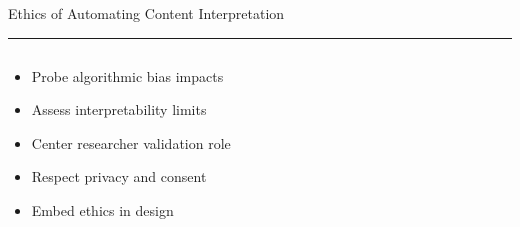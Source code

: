 \documentclass[aspectratio=169]{beamer}
\newcommand{\TitleFont}{\rmfamily}
\begin{document}
\begin{frame}[t]{}
  \vspace*{0.5cm}
  {\TitleFont\fontsize{18}{22}\selectfont\color{LUBronze}Ethics of Automating Content Interpretation\par}
  \vspace{0.3em}
  {\color{LUBronze}\rule{\linewidth}{0.8pt}}\par
  \vspace{0.2cm}
  \begin{columns}[t]
    \begin{column}[t]{0.4\textwidth}
      \vspace*{0pt}
      \begin{itemize}\setlength\itemsep{0.65em}
        \item Probe algorithmic bias impacts
        \item Assess interpretability limits
        \item Center researcher validation role
        \item Respect privacy and consent
        \item Embed ethics in design
      \end{itemize}
    \end{column}
  \end{columns}
\end{frame}
\end{document}
